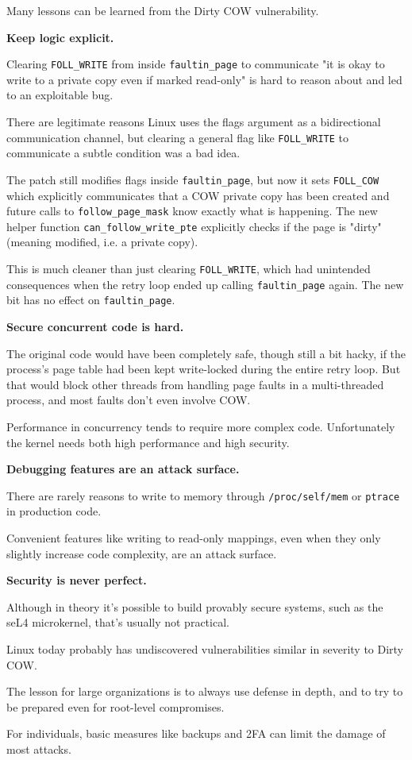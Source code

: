\documentclass[a4paper,10pt,twocolumn,english]{article}
\newcommand{\code}[1]{\texttt{#1}}
\begin{document}
Many lessons can be learned from the Dirty COW vulnerability.

\textbf{Keep logic explicit.}

Clearing \code{FOLL\_WRITE} from inside \code{faultin\_page} to communicate "it is okay to write to a private copy even if marked read-only" is hard to reason about and led to an exploitable bug.

There are legitimate reasons Linux uses the flags argument as a bidirectional communication channel, but clearing a general flag like \code{FOLL\_WRITE} to communicate a subtle condition was a bad idea.

The patch still modifies flags inside \code{faultin\_page}, but now it sets \code{FOLL\_COW} which explicitly communicates that a COW private copy has been created
and future calls to \code{follow\_page\_mask} know exactly what is happening. The new helper function \code{can\_follow\_write\_pte} explicitly checks if the page is "dirty" (meaning modified, i.e. a private copy).

This is much cleaner than just clearing \code{FOLL\_WRITE}, which had unintended consequences when the retry loop ended up calling \code{faultin\_page} again.
The new bit has no effect on \code{faultin\_page}.

\textbf{Secure concurrent code is hard.}

The original code would have been completely safe, though still a bit hacky, if the process's page table had been kept write-locked during the entire retry loop.
But that would block other threads from handling page faults in a multi-threaded process, and most faults don't even involve COW.

Performance in concurrency tends to require more complex code. Unfortunately the kernel needs both high performance and high security.

\textbf{Debugging features are an attack surface.}

There are rarely reasons to write to memory through \code{/proc/self/mem} or \code{ptrace} in production code.

Convenient features like writing to read-only mappings, even when they only slightly increase code complexity, are an attack surface.

\textbf{Security is never perfect.}

Although in theory it's possible to build provably secure systems, such as the seL4 microkernel, that's usually not practical.

Linux today probably has undiscovered vulnerabilities similar in severity to Dirty COW.

The lesson for large organizations is to always use defense in depth, and to try to be prepared even for root-level compromises.

For individuals, basic measures like backups and 2FA can limit the damage of most attacks.


\onecolumn{
	
	
}
\end{document}

